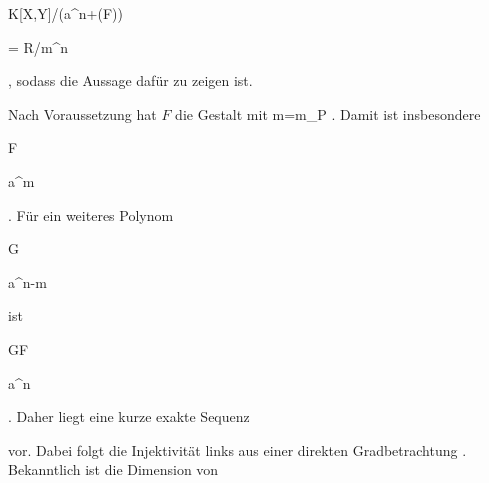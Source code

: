 {\mavergleichskette

{\vergleichskette

{ K[X,Y]/({\mathfrak a}^n+(F))
}

{ = }{ R/{\mathfrak m}^n
}

{  }{
}

{    }{
}

{   }{
}

}
{}{}{,}
sodass die Aussage dafür zu zeigen ist.


Nach Voraussetzung hat $F$ die Gestalt   {  mit  }  { m=m_{P }   }{ .} Damit ist insbesondere


\mavergleichskette

{\vergleichskette

{F
}

{ \in }{ {\mathfrak a}^m
}

{  }{
}

{    }{
}

{   }{
}

}
{}{}{.}
Für ein weiteres Polynom


\mavergleichskette

{\vergleichskette

{G
}

{ \in }{ {\mathfrak a}^{n-m}
}

{  }{
}

{    }{
}

{   }{
}

}
{}{}{}
 {} {}
ist


\mavergleichskette

{\vergleichskette

{GF
}

{ \in }{ {\mathfrak a}^{n}
}

{  }{
}

{    }{
}

{   }{
}

}
{}{}{.}
Daher liegt eine kurze exakte Sequenz


 {  }


vor. Dabei folgt die Injektivität links aus einer direkten Gradbetrachtung
 {} {.}
Bekanntlich ist die Dimension von

}
